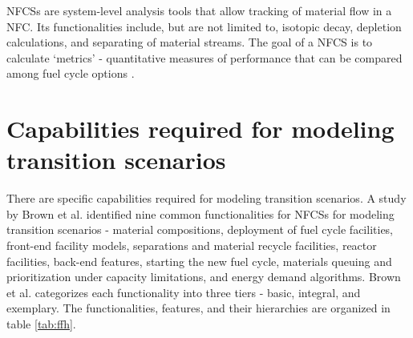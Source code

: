 \glspl{NFCS} are system-level analysis tools
that allow tracking of material flow in a \gls{NFC}. Its
functionalities include, but are not limited to, isotopic decay,
depletion calculations, and separating of material streams.
The goal of a \gls{NFCS} is to calculate `metrics' - quantitative
measures of performance that can be compared among fuel cycle
options \cite{huff_fundamental_2016}.

\section{Capabilities required for modeling transition scenarios}
There are specific capabilities required for modeling transition
scenarios. A study by Brown et al. \cite{brown_identification_2016}
identified nine common functionalities for \glspl{NFCS} for modeling
transition scenarios - material compositions, deployment of fuel
cycle facilities, front-end facility models, separations and material
recycle facilities, reactor facilities, back-end features, starting
the new fuel cycle, materials queuing and prioritization under
capacity limitations, and energy demand algorithms. Brown et al.
categorizes each functionality into three tiers - basic, integral,
and exemplary. The functionalities, features, and their hierarchies
are organized in table \ref{tab:ffh}.

